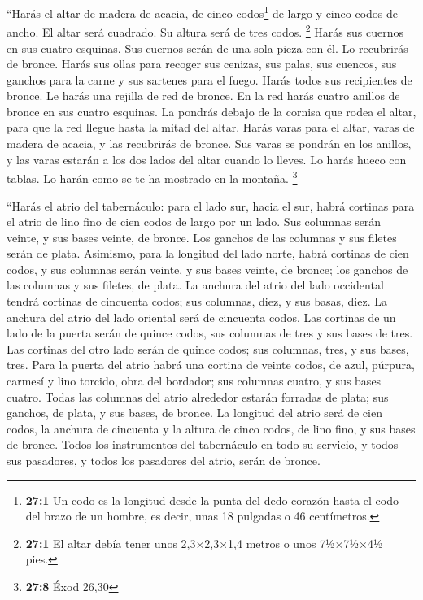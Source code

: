 \begin{paracol}{2}
 ``Harás el altar de madera de acacia, de cinco
codos\footnote{\textbf{27:1} Un codo es la longitud desde la punta del
  dedo corazón hasta el codo del brazo de un hombre, es decir, unas 18
  pulgadas o 46 centímetros.} de largo y cinco codos de ancho. El altar
será cuadrado. Su altura será de tres codos. \footnote{\textbf{27:1} El
  altar debía tener unos 2,3×2,3×1,4 metros o unos 7½×7½×4½ pies.}
 Harás sus cuernos en sus cuatro esquinas. Sus cuernos
serán de una sola pieza con él. Lo recubrirás de bronce. 
Harás sus ollas para recoger sus cenizas, sus palas, sus cuencos, sus
ganchos para la carne y sus sartenes para el fuego. Harás todos sus
recipientes de bronce.  Le harás una rejilla de red de
bronce. En la red harás cuatro anillos de bronce en sus cuatro esquinas.
 La pondrás debajo de la cornisa que rodea el altar, para
que la red llegue hasta la mitad del altar.  Harás varas
para el altar, varas de madera de acacia, y las recubrirás de bronce.
 Sus varas se pondrán en los anillos, y las varas estarán
a los dos lados del altar cuando lo lleves.  Lo harás
hueco con tablas. Lo harán como se te ha mostrado en la montaña.
\footnote{\textbf{27:8} Éxod 26,30}

 ``Harás el atrio del tabernáculo: para el lado sur, hacia
el sur, habrá cortinas para el atrio de lino fino de cien codos de largo
por un lado.  Sus columnas serán veinte, y sus bases
veinte, de bronce. Los ganchos de las columnas y sus filetes serán de
plata.  Asimismo, para la longitud del lado norte, habrá
cortinas de cien codos, y sus columnas serán veinte, y sus bases veinte,
de bronce; los ganchos de las columnas y sus filetes, de plata.
 La anchura del atrio del lado occidental tendrá cortinas
de cincuenta codos; sus columnas, diez, y sus basas, diez.
 La anchura del atrio del lado oriental será de cincuenta
codos.  Las cortinas de un lado de la puerta serán de
quince codos, sus columnas de tres y sus bases de tres. 
Las cortinas del otro lado serán de quince codos; sus columnas, tres, y
sus bases, tres.  Para la puerta del atrio habrá una
cortina de veinte codos, de azul, púrpura, carmesí y lino torcido, obra
del bordador; sus columnas cuatro, y sus bases cuatro. 
Todas las columnas del atrio alrededor estarán forradas de plata; sus
ganchos, de plata, y sus bases, de bronce.  La longitud
del atrio será de cien codos, la anchura de cincuenta y la altura de
cinco codos, de lino fino, y sus bases de bronce.  Todos
los instrumentos del tabernáculo en todo su servicio, y todos sus
pasadores, y todos los pasadores del atrio, serán de bronce.


\end{paracol}
